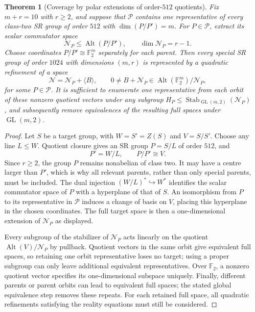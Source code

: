 \documentclass[11pt,a4paper]{amsart}
\newtheorem{thm}{Theorem}[section]
\theoremstyle{definition}
\theoremstyle{remark}
\DeclareMathOperator{\GL}{GL}
\DeclareMathOperator{\Alt}{Alt}
\numberwithin{equation}{section}
\begin{document}
\begin{thm}[Coverage by polar extensions of order-$512$ quotients]
\label{thm:quotient-polar-complete}
Fix $m+r=10$ with $r\ge2$, and suppose that $\mathcal P$ contains
one representative of every class-two SR group of order $512$ with
$\dim(P/P')=m$. For $P\in\mathcal P$, extract its scalar commutator
space
\[
 \mathcal N_P\le\Alt(P/P'),\qquad \dim\mathcal N_P=r-1.
\]
Choose coordinates $P/P'\cong\mathbb F_2^m$ separately for each parent.
Then every special SR group of order $1024$ with dimensions $(m,r)$
is represented by a quadratic refinement of a space
\[
 \mathcal N=\mathcal N_P+\langle B\rangle,
 \qquad 0\ne B+\mathcal N_P\in\Alt(\mathbb F_2^m)/\mathcal N_P,
\]
for some $P\in\mathcal P$. It is sufficient to enumerate one
representative from each orbit of these nonzero quotient vectors under
any subgroup $H_P\le\operatorname{Stab}_{\GL(m,2)}(\mathcal N_P)$, and subsequently
remove equivalences of the resulting full spaces under $\GL(m,2)$.
\end{thm}
\begin{proof}
Let $S$ be a target group, with $W=S'=Z(S)$ and $V=S/S'$.
Choose any line $L\le W$. Quotient closure gives an SR group
$P=S/L$ of order $512$, and
\[
 P'=W/L,\qquad P/P'\cong V.
\]
Since $r\ge2$, the group $P$ remains nonabelian of class two.
It may have a centre larger than $P'$, which is why all relevant
parents, rather than only special parents, must be included.
The dual injection $(W/L)^*\hookrightarrow W^*$ identifies the
scalar commutator space of $P$ with a hyperplane of that of $S$.
An isomorphism from $P$ to its representative in $\mathcal P$ induces
a change of basis on $V$, placing this hyperplane in the chosen
coordinates. The full target space is then a one-dimensional extension
of $\mathcal N_P$ as displayed.

Every subgroup of the stabilizer of $\mathcal N_P$ acts linearly on the quotient
$\Alt(V)/\mathcal N_P$ by pullback. Quotient vectors in the same
orbit give equivalent full spaces, so retaining one orbit
representative loses no target; using a proper subgroup can only leave
additional equivalent representatives. Over $\mathbb F_2$, a nonzero quotient
vector specifies its one-dimensional subspace uniquely.
Finally, different parents or parent orbits can lead to equivalent
full spaces; the stated global equivalence step removes these repeats.
For each retained full space, all quadratic refinements satisfying
the reality equations must still be considered.
\end{proof}
\end{document}
